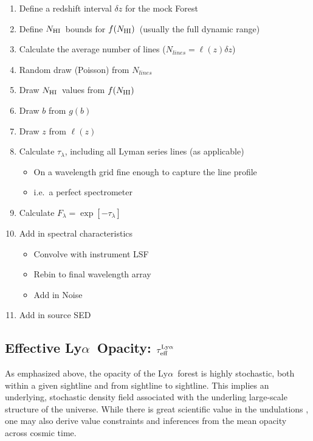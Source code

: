 \documentclass[graybox]{svmult}
\def\lya{Ly$\alpha$}
\newcommand{\mnhi}{N_{\rm HI}}
\newcommand{\nhi}{$\mnhi$}
\def\mfnhi{f(\mnhi)}
\def\fnhi{$\mfnhi$}
\begin{document}
\begin{enumerate}
		\item Define a redshift interval $\delta z$ for the mock Forest
		\item Define \nhi\ bounds for \fnhi\ (usually the full dynamic range)
		\item Calculate the average number of lines 
		($N_{lines} = \ell(z) \delta z$)
		\item Random draw (Poisson) from $N_{lines}$
		\item Draw \nhi\ values from \fnhi
		\item Draw $b$ from $g(b)$
		\item Draw $z$ from $\ell(z)$
		\item Calculate $\tau_\lambda$, including all 
		Lyman series lines (as applicable)
			\begin{itemize}
			\item On a wavelength grid fine enough to 
			capture the line profile
			\item i.e.\ a perfect spectrometer
			\end{itemize}
		\item Calculate $F_\lambda = \exp[-\tau_\lambda]$
		\item Add in spectral characteristics
			\begin{itemize}
			\item Convolve with instrument LSF
			\item Rebin to final wavelength array
			\item Add in Noise
			\end{itemize}
		\item Add in source SED
\end{enumerate}

\subsection{Effective \lya\ Opacity: $\tau_{\rm eff}^{\rm Ly\alpha}$}
\label{sec:teff_lya}
As emphasized above, the opacity of the \lya\ forest
is highly stochastic, both within a given sightline and
from sightline to sightline.
This implies an underlying, stochastic density field
associated with the underling large-scale structure of the
universe.  While there is great scientific value in the
undulations \cite[e.g.]{lee+15}, one may also derive
value constraints and inferences from the mean opacity across
cosmic time.  
\end{document}
